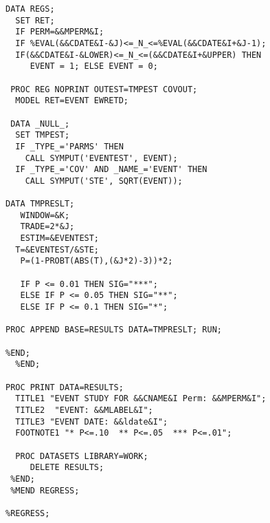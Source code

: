 \begin{singlespace}
\begin{lstlisting}[language=sas,caption=Event studies with SAS]
      DATA REGS;
  SET RET;
  IF PERM=&&MPERM&I;
  IF %EVAL(&&CDATE&I-&J)<=_N_<=%EVAL(&&CDATE&I+&J-1);
  IF(&&CDATE&I-&LOWER)<=_N_<=(&&CDATE&I+&UPPER) THEN
     EVENT = 1; ELSE EVENT = 0;

 PROC REG NOPRINT OUTEST=TMPEST COVOUT;
  MODEL RET=EVENT EWRETD;

 DATA _NULL_;
  SET TMPEST;
  IF _TYPE_='PARMS' THEN
    CALL SYMPUT('EVENTEST', EVENT);
  IF _TYPE_='COV' AND _NAME_='EVENT' THEN
    CALL SYMPUT('STE', SQRT(EVENT));

DATA TMPRESLT;
   WINDOW=&K;
   TRADE=2*&J;
   ESTIM=&EVENTEST;
  T=&EVENTEST/&STE;
   P=(1-PROBT(ABS(T),(&J*2)-3))*2;

   IF P <= 0.01 THEN SIG="***";
   ELSE IF P <= 0.05 THEN SIG="**";
   ELSE IF P <= 0.1 THEN SIG="*";

PROC APPEND BASE=RESULTS DATA=TMPRESLT; RUN;

%END;
  %END;

PROC PRINT DATA=RESULTS;
  TITLE1 "EVENT STUDY FOR &&CNAME&I Perm: &&MPERM&I";
  TITLE2  "EVENT: &&MLABEL&I";
  TITLE3 "EVENT DATE: &&ldate&I";
  FOOTNOTE1 "* P<=.10  ** P<=.05  *** P<=.01";

  PROC DATASETS LIBRARY=WORK;
     DELETE RESULTS;
 %END;
 %MEND REGRESS;

%REGRESS;
\end{lstlisting}
\end{singlespace}
